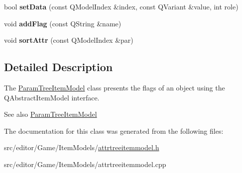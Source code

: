 \begin{DoxyCompactItemize}
\item 
\hypertarget{class_flag_tree_item_model_a574c890e9ccf9575b362d88d2bd7a36c}{bool {\bfseries set\-Data} (const \-Q\-Model\-Index \&index, const \-Q\-Variant \&value, int role)}\label{class_flag_tree_item_model_a574c890e9ccf9575b362d88d2bd7a36c}

\item 
\hypertarget{class_flag_tree_item_model_a51ff995bbfb7c54d608ec23205280211}{void {\bfseries add\-Flag} (const \-Q\-String \&name)}\label{class_flag_tree_item_model_a51ff995bbfb7c54d608ec23205280211}

\item 
\hypertarget{class_flag_tree_item_model_a41730252f38ebda9c249a615ab5b2af2}{void {\bfseries sort\-Attr} (const \-Q\-Model\-Index \&par)}\label{class_flag_tree_item_model_a41730252f38ebda9c249a615ab5b2af2}

\end{DoxyCompactItemize}


\subsection{\-Detailed \-Description}
\-The \hyperlink{class_param_tree_item_model}{\-Param\-Tree\-Item\-Model} class presents the flags of an object using the \-Q\-Abstract\-Item\-Model interface. 

\begin{DoxySeeAlso}{\-See also}
\hyperlink{class_param_tree_item_model}{\-Param\-Tree\-Item\-Model} 
\end{DoxySeeAlso}


\-The documentation for this class was generated from the following files\-:\begin{DoxyCompactItemize}
\item 
src/editor/\-Game/\-Item\-Models/\hyperlink{attrtreeitemmodel_8h}{attrtreeitemmodel.\-h}\item 
src/editor/\-Game/\-Item\-Models/attrtreeitemmodel.\-cpp\end{DoxyCompactItemize}
